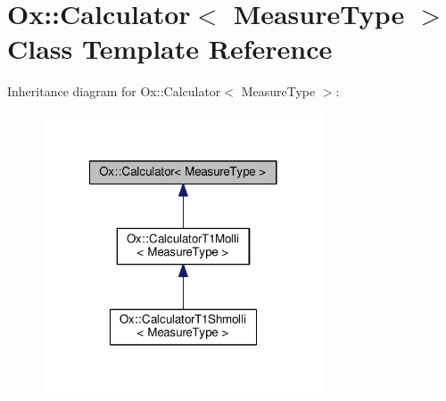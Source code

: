 \hypertarget{class_ox_1_1_calculator}{\section{Ox\-:\-:Calculator$<$ Measure\-Type $>$ Class Template Reference}
\label{class_ox_1_1_calculator}
}


Inheritance diagram for Ox\-:\-:Calculator$<$ Measure\-Type $>$\-:
\nopagebreak
\begin{figure}[H]
\begin{center}
\leavevmode
\includegraphics[width=236pt]{class_ox_1_1_calculator__inherit__graph}
\end{center}
\end{figure}
